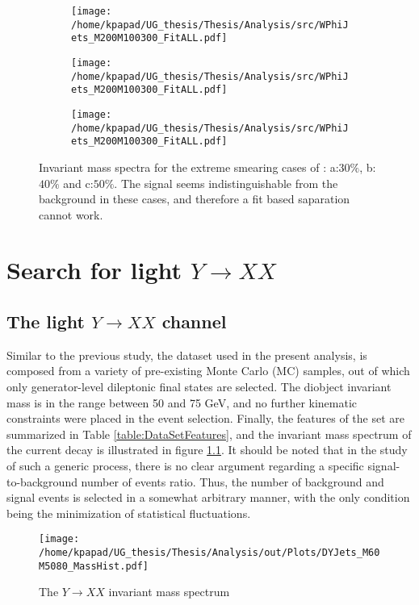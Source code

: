 \begin{figure}[hbpt]
\centering
\begin{subfigure}{0.45\textwidth}
\centering
\texttt{[image: /home/kpapad/UG\_thesis/Thesis/Analysis/src/WPhiJets\_M200M100300\_FitALL.pdf]}
\caption{}
\end{subfigure}
\begin{subfigure}{0.45\textwidth}
\centering
\texttt{[image: /home/kpapad/UG\_thesis/Thesis/Analysis/src/WPhiJets\_M200M100300\_FitALL.pdf]}
\caption{}
\end{subfigure}

\begin{subfigure}{0.45\textwidth}
\centering
\texttt{[image: /home/kpapad/UG\_thesis/Thesis/Analysis/src/WPhiJets\_M200M100300\_FitALL.pdf]}
\caption{}
\end{subfigure}
\caption{Invariant mass spectra for the extreme smearing cases of : a:$30\%$, b:$40\%$ and c:$50\%$. The signal seems indistinguishable from the background in these cases, and therefore a fit based saparation cannot work.}
\label{fig:extremeSmearings}
\end{figure}

\newpage
\chapter{Search for light \(Y \rightarrow XX\)}
\label{sec:org59adc41}
\label{sec:Light_search_Y_to_XX}
\section{The light \(Y\rightarrow XX\) channel}
\label{sec:orgabd932d}
\label{Light_y_to_xx}
Similar to the previous study, the dataset used in the present analysis, is composed from a variety of pre-existing Monte Carlo (MC) samples, out of which only generator-level dileptonic final states are selected. The diobject invariant mass is in the range between 50 and 75 GeV, and no further kinematic constraints were placed in the event selection. Finally, the features of the set are summarized in Table \ref{table:DataSetFeatures}, and the invariant mass spectrum of the current decay is illustrated in figure \ref{fig:LightMassSpectrum}. It should be noted that in the study of such a generic process, there is no clear argument regarding a specific signal-to-background number of events ratio. Thus, the number of background and signal events is selected in a somewhat arbitrary manner, with the only condition being the minimization of statistical fluctuations.
\begin{figure}[h]
\centering
\texttt{[image: /home/kpapad/UG\_thesis/Thesis/Analysis/out/Plots/DYJets\_M60M5080\_MassHist.pdf]}
\caption{The $Y\rightarrow XX$ invariant mass spectrum}
\label{fig:LightMassSpectrum}
\end{figure}

